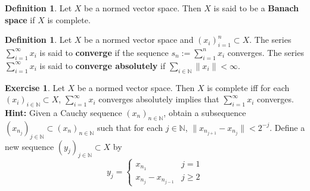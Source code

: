 \documentclass[12pt]{amsart}
\theoremstyle{definition}
\newtheorem{defn}[definition]{Definition}
\newtheorem{ex}[definition]{Exercise}
\newcommand{\N}{\mathbb{N}}
\newcommand{\seq}[2]{(#1_{#2})_{#2 \in \N}}
\newcommand{\lex}[1]{\label{ex:#1}}
\newcommand{\ld}[1]{\label{defn:#1}}
\begin{document}
	\begin{defn} \ld{}
		Let $X$ be a normed vector space. Then $X$ is said to be a \textbf{Banach space} if $X$ is complete.  
	\end{defn}
	
	\begin{defn} \ld{}
		Let $X$ be a normed vector space and $(x_i)_{i=1}^n \subset X$. The series $\sum_{i =1}^{\infty}x_i$ is said to \textbf{converge} if the sequence $s_n := \sum_{i=1}^n x_i$ converges. The series $\sum_{i =1}^{\infty}x_i$ is said to \textbf{converge absolutely} if $\sum_{i\in \N}\|x_i \|< \infty$.
	\end{defn}
	
	\begin{ex} \lex{}
		Let $X$ be a normed vector space. Then $X$ is complete iff for each $\seq{x}{i} \subset X$, $\sum_{i =1}^{\infty}x_i$ converges absolutely implies that $\sum_{i=1}^{\infty}x_i$ converges. \\
		\textbf{Hint:} Given a Cauchy sequence $(x_n)_{n \in \N}$, obtain a subsequence $(x_{n_j})_{j \in \N} \subset (x_n)_{n \in \N}$ such that for each $j \in \N$, $\|x_{n_{j+1}} - x_{n_{j}}\| < 2^{-j}$. Define a new sequence $(y_j)_{j \in \N} \subset X$ by 
		\[
		y_j = 
		\begin{cases}
		x_{n_1} & j =1 \\  
		x_{n_j} - x_{n_{j-1}} & j \geq 2	
		\end{cases}
		\] 
	\end{ex}
	
\end{document}
